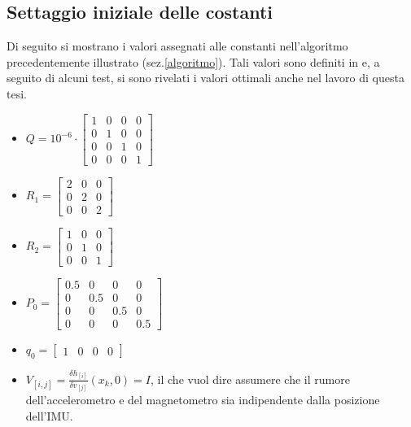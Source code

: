 \subsection{Settaggio iniziale delle costanti}
Di seguito si mostrano i valori assegnati alle constanti nell'algoritmo precedentemente illustrato (sez.\ref{algoritmo}). Tali valori sono definiti in \cite{trackingThesis} e, a seguito di alcuni test, si sono rivelati i valori ottimali anche nel lavoro di questa tesi.
\begin{itemize}
\item $Q = 10^{-6} \cdot \begin{bmatrix}
1 & 0 & 0 & 0  \\
0 & 1 & 0 & 0\\
0 & 0 & 1 & 0 \\
0 & 0 & 0 & 1 
\end{bmatrix}$
\item $R_1 = \begin{bmatrix}
2 & 0 & 0 \\
0 & 2 & 0\\
0 & 0 & 2
\end{bmatrix} $
\item $R_2 = \begin{bmatrix}
1 & 0 & 0 \\
0 & 1 & 0\\
0 & 0 & 1
\end{bmatrix} $
\item $P_0 = \begin{bmatrix}
0.5 & 0 & 0 & 0\\
0 & 0.5 & 0 & 0\\
0 & 0 & 0.5 & 0 \\
0 & 0 & 0 & 0.5
\end{bmatrix} $
\item $q_0 = \begin{bmatrix}
1 & 0 & 0 & 0
\end{bmatrix} $
\item $V_{[i,j]} = \frac{\delta h_{[i]}}{\delta v_{[j]}} (x_k,0) = I$, il che vuol dire assumere che il rumore dell'accelerometro e del magnetometro sia indipendente dalla posizione dell'IMU.
\end{itemize}





























